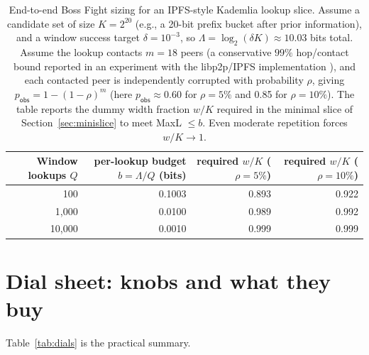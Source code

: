 \documentclass[11pt]{article}
\begin{document}
\begin{table}[t]
\centering
\small
\begin{tabular}{@{}r r r r@{}}
\toprule
Window lookups $Q$ & per-lookup budget $b=\Lambda/Q$ (bits) & required $w/K$ ($\rho{=}5\%$) & required $w/K$ ($\rho{=}10\%$) \\
\midrule
100 & 0.1003 & 0.893 & 0.922 \\
1,000 & 0.0100 & 0.989 & 0.992 \\
10,000 & 0.0010 & 0.999 & 0.999 \\
\bottomrule
\end{tabular}
\caption{End-to-end Boss Fight sizing for an IPFS-style Kademlia lookup slice. Assume a candidate set of size $K=2^{20}$ (e.g., a 20-bit prefix bucket after prior information), and a window success target $\delta=10^{-3}$, so $\Lambda=\log_2(\delta K)\approx 10.03$ bits total. Assume the lookup contacts $m=18$ peers (a conservative $99\%$ hop/contact bound reported in an experiment with the libp2p/IPFS implementation \cite{cortes2024kadlimits}), and each contacted peer is independently corrupted with probability $\rho$, giving $p_{\mathsf{obs}}=1-(1-\rho)^m$ (here $p_{\mathsf{obs}}\approx 0.60$ for $\rho=5\%$ and 0.85 for $\rho=10\%$). The table reports the dummy width fraction $w/K$ required in the minimal slice of Section~\ref{sec:minislice} to meet MaxL $\le b$. Even moderate repetition forces $w/K\to 1$.}
\label{tab:end_to_end_ipfs_window}
\end{table}



\section{Dial sheet: knobs and what they buy}\label{sec:dials}
Table~\ref{tab:dials} is the practical summary.
\end{document}
